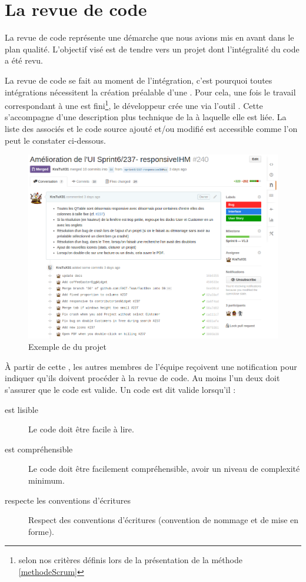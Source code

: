 \section{La revue de code}\label{revue}
La revue de code représente une démarche que nous avions mis en avant dans le plan qualité. L'objectif visé est de tendre vers un projet dont l'intégralité du code a été revu. 

La revue de code se fait au moment de l'intégration, c'est pourquoi toutes intégrations nécessitent la création préalable d'une \PullRequest. Pour cela, une fois le travail correspondant à une \UserStory{} est fini\footnote{selon nos critères définis lors de la présentation de la méthode \Scrum{} \ref{methodeScrum}}, le développeur crée une \PullRequest{} via l'outil \Github. Cette \PullRequest s'accompagne d'une description plus technique de la \UserStory{} à laquelle elle est liée. La liste des \Commits{} associés et le code source ajouté et/ou modifié est accessible comme l'on peut le constater ci-dessous. 
\begin{figure}[H]
	\centering
	\includegraphics[width=0.7\linewidth]{screens/creation_pr_github}
	\caption{Exemple de \PullRequest{} du projet \FactDev}
	\label{fig:creation_pr_github}
\end{figure}

\`A partir de cette \PullRequest, les autres membres de l'équipe reçoivent une notification pour indiquer qu'ils doivent procéder à la revue de code. Au moins l'un deux doit s'assurer que le code est valide. Un code est dit valide lorsqu'il :
\begin{description}
	\item[est lisible] Le code doit être facile à lire. 
	\item[est compréhensible] Le code doit être facilement compréhensible, avoir un niveau de complexité minimum.
	\item[respecte les conventions d'écritures] Respect des conventions d'écritures (convention de nommage et de mise en forme).
\end{description}

